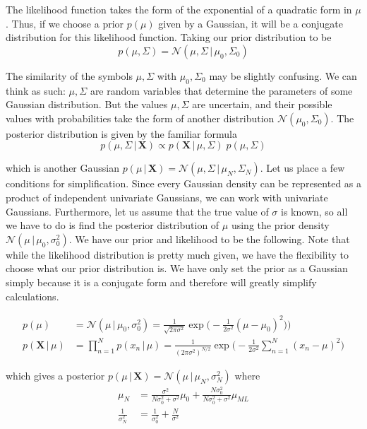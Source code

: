 \documentclass{article}
\begin{document}
    The likelihood function takes the form of the exponential of a quadratic form in $\mu$. Thus, if we choose a prior $p(\mu)$ given by a Gaussian, it will be a conjugate distribution for this likelihood function. Taking our prior distribution to be
    \begin{equation}
      p(\mu, \Sigma) = \mathcal{N}(\mu, \Sigma\,|\,\mu_0, \Sigma_0)
    \end{equation}

    The similarity of the symbols $\mu, \Sigma$ with $\mu_0, \Sigma_0$ may be slightly confusing. We can think as such: $\mu, \Sigma$ are random variables that determine the parameters of some Gaussian distribution. But the values $\mu, \Sigma$ are uncertain, and their possible values with probabilities take the form of another distribution $\mathcal{N}(\mu_0, \Sigma_0)$. The posterior distribution is given by the familiar formula
    \begin{equation}
      p(\mu, \Sigma\,|\,\mathbf{X}) \propto p(\mathbf{X}\,|\,\mu, \Sigma) \; p(\mu, \Sigma)
    \end{equation}

    which is another Gaussian $p(\mu\,|\,\mathbf{X}) = \mathcal{N}(\mu, \Sigma\,|\, \mu_N, \Sigma_N)$. Let us place a few conditions for simplification. Since every Gaussian density can be represented as a product of independent univariate Gaussians, we can work with univariate Gaussians. Furthermore, let us assume that the true value of $\sigma$ is known, so all we have to do is find the posterior distribution of $\mu$ using the prior density $\mathcal{N}(\mu\,|\,\mu_0, \sigma_0^2)$. We have our prior and likelihood to be the following. Note that while the likelihood distribution is pretty much given, we have the flexibility to choose what our prior distribution is. We have only set the prior as a Gaussian simply because it is a conjugate form and therefore will greatly simplify calculations.

    \begin{align*}
      p(\mu) & = \mathcal{N}(\mu\,|\,\mu_0, \sigma_0^2) = \frac{1}{\sqrt{2 \pi \sigma^2}} \exp\bigg(-\frac{1}{2\sigma^2} (\mu - \mu_0)^2) \bigg) \\
      p(\mathbf{X}\,|\,\mu) & = \prod_{n=1}^N p(x_n\,|\,\mu) = \frac{1}{(2 \pi \sigma^2)^{N/2}} \exp\bigg(-\frac{1}{2 \sigma^2} \sum_{n=1}^N (x_n - \mu)^2 \bigg)
    \end{align*}

    which gives a posterior $p(\mu\,|\,\mathbf{X}) = \mathcal{N}(\mu \,|\, \mu_N, \sigma_N^2)$ where
    \begin{align*}
      \mu_N & = \frac{\sigma^2}{N \sigma_0^2 + \sigma^2} \mu_0 + \frac{N \sigma_0^2}{N \sigma_0^2 + \sigma^2} \mu_{ML} \\
      \frac{1}{\sigma_N^2} & = \frac{1}{\sigma_0^2} + \frac{N}{\sigma^2}
    \end{align*}
\end{document}
